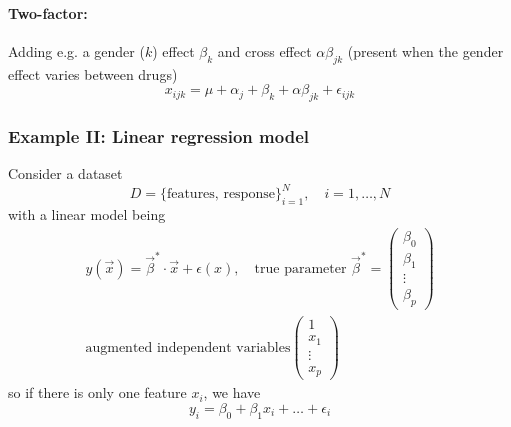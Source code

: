 \paragraph*{Two-factor:} Adding e.g. a gender ($k$) effect $\beta_k$ and cross effect $\alpha \beta_{jk}$ (present
when the gender effect varies between drugs)
\begin{equation}
    x_{ijk} = \mu + \alpha_j + \beta_k + \alpha \beta_{jk} + \epsilon_{ijk}
\end{equation}

\subsubsection{Example II: Linear regression model}
Consider a dataset
\begin{equation}
    D = \{\text{features, response}\}_{i=1}^N, \quad i = 1,\dots,N
\end{equation}
with a linear model being
\begin{equation}
    \begin{gathered}    
        y(\vec{x}) = \vec{\beta}^* \cdot \vec{x} + \epsilon(x), \quad \text{true parameter } \vec{\beta}^* = \left( \begin{array}{c} \beta_0 \\ \beta_1 \\ \vdots \\ \beta_p \end{array} \right) \\
        \text{augmented independent variables} \left( \begin{array}{c} 1 \\ x_1 \\ \vdots \\ x_p \end{array} \right)
    \end{gathered}
\end{equation}
so if there is only one feature $x_i$, we have
\begin{equation}
    y_i = \beta_0 + \beta_1 x_i + \dots + \epsilon_i
\end{equation}


